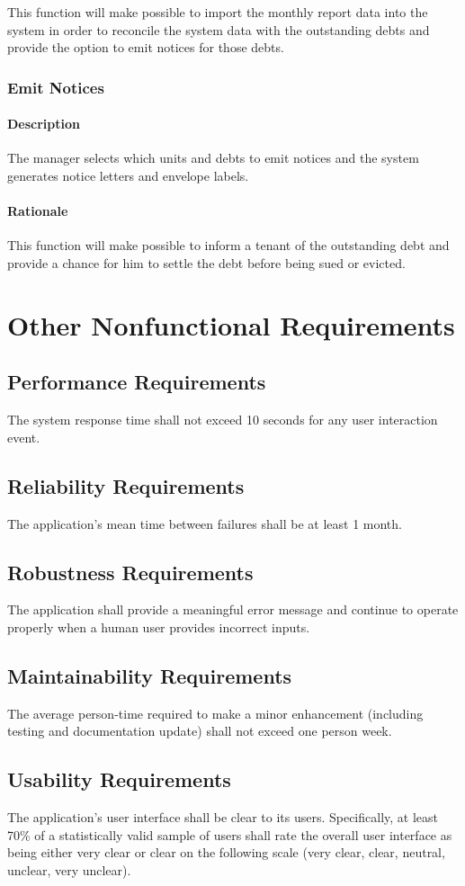 \documentclass{scrreprt}
\begin{document}
This function will make possible to import the monthly report data into the system in order to reconcile the system data with the outstanding debts and provide the option to emit notices for those debts.

\subsection{Emit Notices}
\subsubsection{Description}

The manager selects which units and debts to emit notices and the system generates notice letters and envelope labels.

\subsubsection{Rationale}

This function will make possible to inform a tenant of the outstanding debt and provide a chance for him to settle the debt before being sued or evicted.

\chapter{Other Nonfunctional Requirements}

\section{Performance Requirements}
The system response time shall not exceed 10 seconds for any user interaction event.

\section{Reliability Requirements}
The application’s mean time between failures shall be at least 1 month.

\section{Robustness Requirements}
The application shall provide a meaningful error message and continue to operate properly when a human user provides incorrect inputs.

\section{Maintainability Requirements}
The average person-time required to make a minor enhancement (including testing and documentation update) shall not exceed one person week.

\section{Usability Requirements}
The application’s user interface shall be clear to its users.
Specifically, at least 70\% of a statistically valid sample of users shall rate the overall user interface as being either very clear or clear on the following scale (very clear, clear, neutral, unclear, very unclear).
\end{document}
